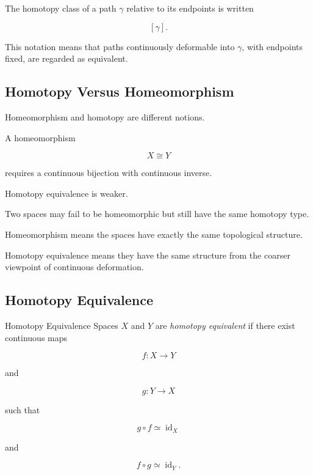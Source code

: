 The homotopy class of a path \(\gamma\) relative to its endpoints is written

\[
\boxed{
[\gamma].
}
\]

This notation means that paths continuously deformable into \(\gamma\), with
endpoints fixed, are regarded as equivalent.

\subsection{Homotopy Versus Homeomorphism}
\label{subsec:homotopy-vs-homeomorphism}

Homeomorphism and homotopy are different notions.

A homeomorphism

\[
X\cong Y
\]

requires a continuous bijection with continuous inverse.

Homotopy equivalence is weaker.

Two spaces may fail to be homeomorphic but still have the same homotopy
type.

\begin{importantbox}
Homeomorphism means the spaces have exactly the same topological structure.

Homotopy equivalence means they have the same structure from the coarser
viewpoint of continuous deformation.
\end{importantbox}

\subsection{Homotopy Equivalence}
\label{subsec:homotopy-equivalence}

\begin{definitionbox}{Homotopy Equivalence}
Spaces \(X\) and \(Y\) are \emph{homotopy equivalent} if there exist
continuous maps

\[
f:X\to Y
\]

and

\[
g:Y\to X
\]

such that

\[
\boxed{
g\circ f\simeq\operatorname{id}_X
}
\]

and

\[
\boxed{
f\circ g\simeq\operatorname{id}_Y.
}
\]
\end{definitionbox}

